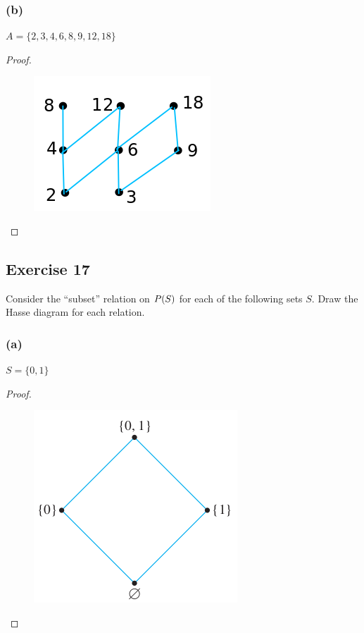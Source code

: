 \documentclass[14pt]{extarticle}
\let\mathscr\relax
\newcommand{\ps}{\mathscr{P}} %
\begin{document}
\subsubsection{(b)}
\(A = \{2, 3, 4, 6, 8, 9, 12, 18\}\)

\begin{proof}
        \begin{figure}[ht!]
                \centering
                \includegraphics[scale=0.5]{../images/8.5.16.b.png}
        \end{figure}
\end{proof}

\subsection{Exercise 17}
Consider the “subset” relation on \(\ps(S)\) for each of the following sets $S$.
Draw the Hasse diagram for each relation.

\subsubsection{(a)}
\(S = \{0, 1\}\)

\begin{proof}
        \begin{figure}[ht!]
                \centering
                \includegraphics[scale=0.4]{../images/8.5.17.a.png}
        \end{figure}
\end{proof}
\end{document}
